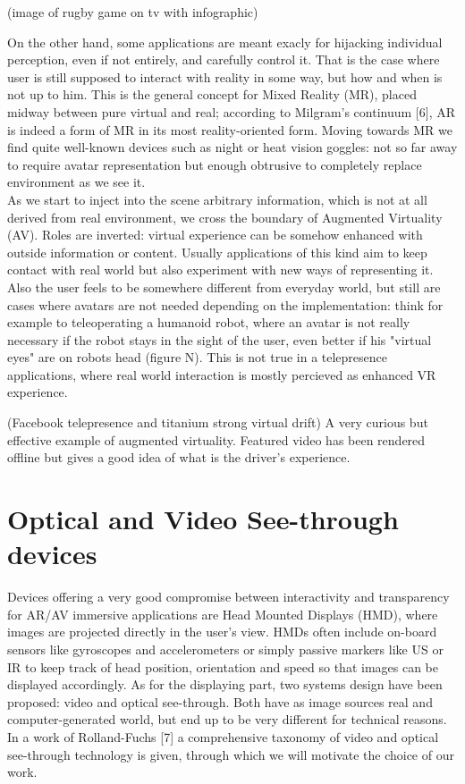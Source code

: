 (image of rugby game on tv with infographic)

On the other hand, some applications are meant exacly for hijacking individual perception, even if not entirely, and carefully control it. That is the case where user is still supposed to interact with reality in some way, but how and when is not up to him. This is the general concept for Mixed Reality (MR), placed midway between pure virtual and real; according to Milgram’s continuum [6], AR is indeed a form of MR in its most reality-oriented form. Moving towards MR we find quite well-known devices such as night or heat vision goggles: not so far away to require avatar representation but enough obtrusive to completely replace environment as we see it.\\
As we start to inject into the scene arbitrary information, which is not at all derived from real environment, we cross the boundary of Augmented Virtuality (AV). Roles are inverted: virtual experience can be somehow enhanced with outside information or content. Usually applications of this kind aim to keep contact with real world but also experiment with new ways of representing it. Also the user feels to be somewhere different from everyday world, but still are cases where avatars are not needed depending on the implementation: think for example to teleoperating a humanoid robot, where an avatar is not really necessary if the robot stays in the sight of the user, even better if his "virtual eyes" are on robots head (figure N). This is not true in a telepresence applications, where real world interaction is mostly percieved as enhanced VR experience.

(Facebook telepresence and titanium strong virtual drift) A very curious but effective example of augmented virtuality. Featured video has been rendered offline but gives a good idea of what is the driver's experience.

\section{Optical and Video See-through devices} %
Devices offering a very good compromise between interactivity and transparency for AR/AV immersive applications are Head Mounted Displays (HMD), where images are projected directly in the user’s view. HMDs often include on-board sensors like gyroscopes and accelerometers or simply passive markers like US or IR to keep track of head position, orientation and speed so that images can be displayed accordingly. As for the displaying part, two systems design have been proposed: video and optical see-through. Both have as image sources real and computer-generated world, but end up to be very different for technical reasons. In a work of Rolland-Fuchs [7] a comprehensive taxonomy of video and optical see-through technology is given, through which we will motivate the choice of our work.

